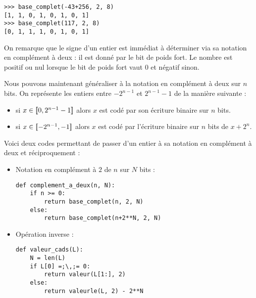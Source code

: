 \begin{lstlisting}
>>> base_complet(-43+256, 2, 8)
[1, 1, 0, 1, 0, 1, 0, 1]
>>> base_complet(117, 2, 8)
[0, 1, 1, 1, 0, 1, 0, 1]
\end{lstlisting}


On remarque que le signe d'un entier est immédiat à déterminer via sa notation en complément à deux : il est donné par le bit de poids fort. Le nombre est positif ou nul lorsque le bit de poids fort vaut $0$ et négatif sinon.

Nous pouvons maintenant généraliser à la notation en complément à deux sur $n$ bits. On représente les entiers entre $-2^{n-1}$ et $2^{n-1}-1$ de la manière suivante :

\begin{itemize}

\item si $x \in [\![ 0 , 2^{n-1}-1 ]\!]$ alors $x$ est codé par son écriture binaire sur $n$ bits.

\item si $x \in [\![ -2^{n-1} , -1 ]\!]$ alors $x$ est codé par l'écriture binaire sur $n$ bits de $x+2^n$.

\end{itemize}






\bigskip
 Voici deux codes permettant de passer d'un entier à sa notation en complément à deux et réciproquement :


\begin{itemize}

\item Notation en complément à $2$ de $n$ sur $N$ bits :\\

\begin{lstlisting}  
def complement_a_deux(n, N):
    if n >= 0:
        return base_complet(n, 2, N)
    else:
        return base_complet(n+2**N, 2, N)
\end{lstlisting}

\medskip

\item Opération inverse :\\

\begin{lstlisting}[escapeinside=;;]
def valeur_cads(L):
    N = len(L)
    if L[0] =;\,;= 0:
        return valeur(L[1:], 2)
    else:
        return valeurle(L, 2) - 2**N
\end{lstlisting}
\end{itemize}

